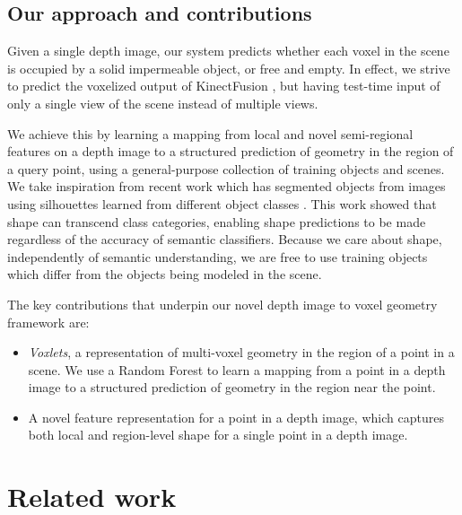 \documentclass[10pt,twocolumn,letterpaper]{article}
\makeatletter
\renewcommand*{\eg}{e.g.\@\xspace}
\makeatother
\begin{document}
\subsection{Our approach and contributions}

Given a single depth image, our system predicts whether each voxel in the scene is occupied by a solid impermeable object, or free and empty.
In effect, we strive to predict the voxelized output of KinectFusion \cite{izadi-uist-2011}, but having test-time input of only a single view of the scene instead of multiple views.

We achieve this by learning a mapping from local and novel semi-regional features on a depth image to a structured prediction of geometry in the region of a query point, using a general-purpose collection of training objects and scenes.
We take inspiration from recent work which has segmented objects from images using silhouettes learned from different object classes \cite{kim-eccv-2012}.
This work showed that shape can transcend class categories, enabling shape predictions to be made regardless of the accuracy of semantic classifiers.
Because we care about shape, independently of semantic understanding, we are free to use training objects which differ from the objects being modeled in the scene.

The key contributions that underpin our novel depth image to voxel geometry framework are:
\begin{itemize}
\item \emph{Voxlets}, a representation of multi-voxel geometry in the region of a point in a scene.
We use a Random Forest to learn a mapping from a point in a depth image to a structured prediction of geometry in the region near the point.
\item A novel feature representation for a point in a depth image, which captures both local and region-level shape for a single point in a depth image.
\end{itemize}


\section{Related work}

\end{document}
